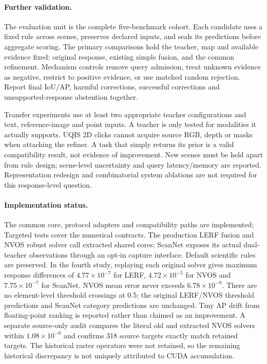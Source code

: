 \documentclass[10pt]{article}
\begin{document}
\paragraph{Further validation.}
The evaluation unit is the complete five-benchmark cohort. Each candidate
uses a fixed rule across scenes, preserves declared inputs, and seals its
predictions before aggregate scoring. The primary comparisons hold the teacher,
map and available evidence fixed: original response, existing simple fusion,
and the common refinement. Mechanism controls remove query admission, treat
unknown evidence as negative, restrict to positive evidence, or use matched
random rejection. Report final IoU/AP, harmful corrections, successful
corrections and unsupported-response abstention together.

Transfer experiments use at least two appropriate teacher configurations and
text, reference-image and point inputs. A teacher is only tested for modalities
it actually supports. UQIS 2D clicks cannot acquire source RGB, depth or masks
when attaching the refiner. A task that simply returns its prior is a valid
compatibility result, not evidence of improvement. New scenes must be held
apart from rule design; scene-level uncertainty and query latency/memory are
reported. Representation redesign and combinatorial system ablations are not
required for this response-level question.

\paragraph{Implementation status.}
The common core, protocol adapters and compatibility paths are implemented;
Targeted tests cover the numerical contracts. The production LERF fusion and NVOS robust solver call
extracted shared cores; ScanNet exposes its actual dual-teacher observations
through an opt-in capture interface. Default scientific rules are preserved.
In the fourth study, replaying each original solver gives maximum response
differences of $4.77\times10^{-7}$ for LERF, $4.72\times10^{-5}$ for NVOS and
$7.75\times10^{-7}$ for ScanNet. NVOS mean error never exceeds
$6.78\times10^{-8}$. There are no element-level threshold crossings at 0.5;
the original LERF/NVOS threshold predictions and ScanNet category predictions
are unchanged. Tiny AP drift from floating-point ranking is reported rather
than claimed as an improvement. A separate source-only audit compares the
literal old and extracted NVOS solvers within $1.08\times10^{-6}$ and confirms
318 source targets exactly match retained targets. The historical raster
operators were not retained, so the remaining historical discrepancy is not
uniquely attributed to CUDA accumulation.
\end{document}
